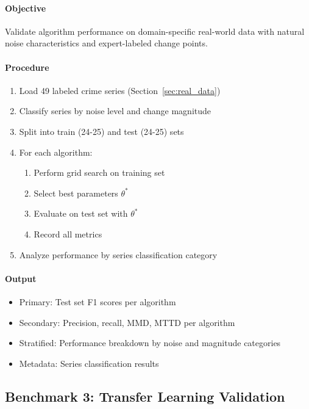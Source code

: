 \documentclass[journal,article,submit,pdftex,moreauthors]{Definitions/mdpi}
\begin{document}
\paragraph{Objective}

Validate algorithm performance on domain-specific real-world data with natural noise characteristics and expert-labeled change points.

\paragraph{Procedure}

\begin{enumerate}
    \item Load 49 labeled crime series (Section~\ref{sec:real_data})
    \item Classify series by noise level and change magnitude
    \item Split into train (24-25) and test (24-25) sets
    \item For each algorithm:
    \begin{enumerate}
        \item Perform grid search on training set
        \item Select best parameters $\theta^*$
        \item Evaluate on test set with $\theta^*$
        \item Record all metrics
    \end{enumerate}
    \item Analyze performance by series classification category
\end{enumerate}

\paragraph{Output}

\begin{itemize}
    \item Primary: Test set F1 scores per algorithm
    \item Secondary: Precision, recall, MMD, MTTD per algorithm
    \item Stratified: Performance breakdown by noise and magnitude categories
    \item Metadata: Series classification results
\end{itemize}

\subsection{Benchmark 3: Transfer Learning Validation}
\label{sec:benchmark3}
\end{document}
